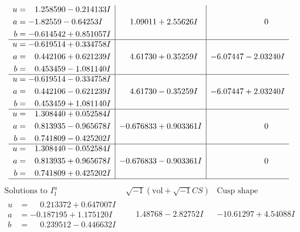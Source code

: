 \documentclass[1p]{elsarticle_modified}
\theoremstyle{definition}
\newcommand{\I}{\sqrt{-1}}
\begin{document}
$$\begin{array}{c|c|c}
\begin{aligned}
u &= \phantom{-}1.258590 - 0.214133 I \\
a &= -1.82559 - 0.64253 I \\
b &= -0.614542 + 0.851057 I\end{aligned}
 & \phantom{-}1.09011 + 2.55626 I & \phantom{-0.000000 } 0 \\ \hline\begin{aligned}
u &= -0.619514 + 0.334758 I \\
a &= \phantom{-}0.442106 + 0.621239 I \\
b &= \phantom{-}0.453459 - 1.081140 I\end{aligned}
 & \phantom{-}4.61730 + 0.35259 I & -6.07447 - 2.03240 I \\ \hline\begin{aligned}
u &= -0.619514 - 0.334758 I \\
a &= \phantom{-}0.442106 - 0.621239 I \\
b &= \phantom{-}0.453459 + 1.081140 I\end{aligned}
 & \phantom{-}4.61730 - 0.35259 I & -6.07447 + 2.03240 I \\ \hline\begin{aligned}
u &= \phantom{-}1.308440 + 0.052584 I \\
a &= \phantom{-}0.813935 - 0.965678 I \\
b &= \phantom{-}0.741809 - 0.425202 I\end{aligned}
 & -0.676833 + 0.903361 I & \phantom{-0.000000 } 0 \\ \hline\begin{aligned}
u &= \phantom{-}1.308440 - 0.052584 I \\
a &= \phantom{-}0.813935 + 0.965678 I \\
b &= \phantom{-}0.741809 + 0.425202 I\end{aligned}
 & -0.676833 - 0.903361 I & \phantom{-0.000000 } 0\\
 \hline 
 \end{array}$$\newpage$$\begin{array}{c|c|c}  
\text{Solutions to }I^u_{1}& \I (\text{vol} + \sqrt{-1}CS) & \text{Cusp shape}\\
 \hline 
\begin{aligned}
u &= \phantom{-}0.213372 + 0.647007 I \\
a &= -0.187195 + 1.175120 I \\
b &= \phantom{-}0.239512 - 0.446632 I\end{aligned}
 & \phantom{-}1.48768 - 2.82752 I & -10.61297 + 4.54088 I \\ \hline\begin{aligned}

\end{aligned}
\end{array}$$
\end{document}
